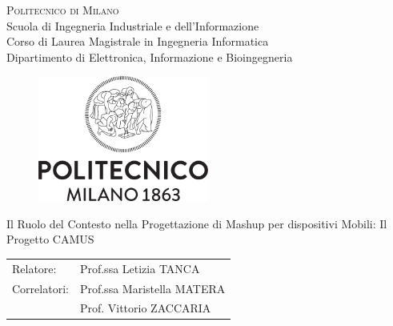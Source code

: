 \begin{titlepage}

\begin{center}
\Large{\textsc{Politecnico di Milano}}\\
\Large{Scuola di Ingegneria Industriale e dell'Informazione}\\
\large{Corso di Laurea Magistrale in Ingegneria Informatica}\\
\large{Dipartimento di Elettronica, Informazione e Bioingegneria}
\par\end{center}

\vspace{0.5cm}


\begin{center}
\begin{figure}[h]
\centering{}\includegraphics[width=0.5\textwidth]{frontespizio/logo-polimi.png}
\end{figure}
\vspace{1cm}

\par\end{center}

\begin{center}
\LARGE{Il Ruolo del Contesto nella Progettazione di Mashup per dispositivi Mobili: Il Progetto CAMUS}\vspace{2cm}

\par\end{center}

\begin{flushleft}
\begin{tabular}{ll}
Relatore:  & Prof.ssa Letizia TANCA\tabularnewline
Correlatori:  & Prof.ssa Maristella MATERA\tabularnewline
	& Prof. Vittorio ZACCARIA
\end{tabular}\vspace{1cm}

\par\end{flushleft}


\end{titlepage}
